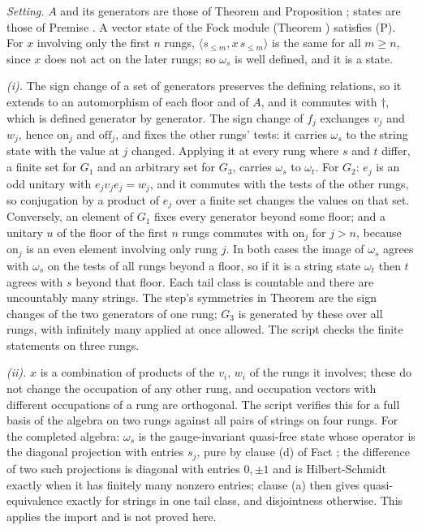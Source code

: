 \emph{Setting.} $A$ and its generators are those of Theorem  and Proposition ; states are those of Premise . A vector state of the Fock module (Theorem ) satisfies (P). For $x$ involving only the first $n$ rungs, $\langle s_{\le m}, x\,s_{\le m}\rangle$ is the same for all $m \ge n$, since $x$ does not act on the later rungs; so $\omega_{s}$ is well defined, and it is a state.

\emph{(i).} The sign change of a set of generators preserves the defining relations, so it extends to an automorphism of each floor and of $A$, and it commutes with $\dagger$, which is defined generator by generator. The sign change of $f_{j}$ exchanges $v_{j}$ and $w_{j}$, hence $\mathrm{on}_{j}$ and $\mathrm{off}_{j}$, and fixes the other rungs' tests: it carries $\omega_{s}$ to the string state with the value at $j$ changed. Applying it at every rung where $s$ and $t$ differ, a finite set for $G_{1}$ and an arbitrary set for $G_{3}$, carries $\omega_{s}$ to $\omega_{t}$. For $G_{2}$: $e_{j}$ is an odd unitary with $e_{j}v_{j}e_{j} = w_{j}$, and it commutes with the tests of the other rungs, so conjugation by a product of $e_{j}$ over a finite set changes the values on that set. Conversely, an element of $G_{1}$ fixes every generator beyond some floor; and a unitary $u$ of the floor of the first $n$ rungs commutes with $\mathrm{on}_{j}$ for $j > n$, because $\mathrm{on}_{j}$ is an even element involving only rung $j$. In both cases the image of $\omega_{s}$ agrees with $\omega_{s}$ on the tests of all rungs beyond a floor, so if it is a string state $\omega_{t}$ then $t$ agrees with $s$ beyond that floor. Each tail class is countable and there are uncountably many strings. The step's symmetries in Theorem  are the sign changes of the two generators of one rung; $G_{3}$ is generated by these over all rungs, with infinitely many applied at once allowed. The script checks the finite statements on three rungs.

\emph{(ii).} $x$ is a combination of products of the $v_{i}$, $w_{i}$ of the rungs it involves; these do not change the occupation of any other rung, and occupation vectors with different occupations of a rung are orthogonal. The script verifies this for a full basis of the algebra on two rungs against all pairs of strings on four rungs. For the completed algebra: $\omega_{s}$ is the gauge-invariant quasi-free state whose operator is the diagonal projection with entries $s_{j}$, pure by clause (d) of Fact ; the difference of two such projections is diagonal with entries $0, \pm 1$ and is Hilbert-Schmidt exactly when it has finitely many nonzero entries; clause (a) then gives quasi-equivalence exactly for strings in one tail class, and disjointness otherwise. This applies the import and is not proved here.

